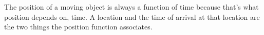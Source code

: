




The position of a moving object is always a function of time because
that's what position depends on, time.  A location and the time of
arrival at that location are the two things the position function
associates.

